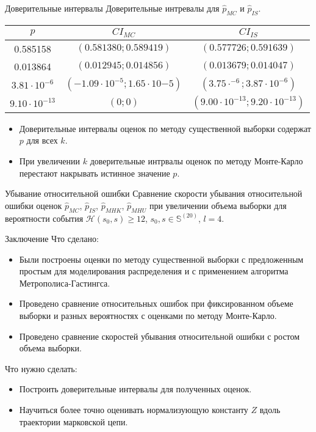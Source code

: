 \documentclass[pdf, 10pt, unicode]{beamer}
\begin{document}
\begin{frame}{Доверительные интервалы}
Доверительные интревалы для $\hat{p}_{MC}$ и $\hat{p}_{IS}$.
\begin{table}[]
\begin{tabular}{@{}ccc@{}}
\toprule
$p$      & $CI_{MC}$               & $CI_{IS}$               \\ \midrule
0.585158 & $(0.581380 ; 0.589419)$ & $(0.577726 ; 0.591639)$ \\
0.013864 & $(0.012945 ; 0.014856)$ & $(0.013679 ; 0.014047)$ \\
$3.81\cdot 10^{-6}$  & $(-1.09\cdot 10^{-5} ; 1.65\cdot 10{-5})$ & $(3.75\cdot^{-6} ; 3.87\cdot 10^{-6})$      \\
$9.10\cdot 10^{-13}$ & $(0 ; 0)$                                 & $(9.00\cdot 10^{-13} ; 9.20\cdot 10^{-13})$ \\ \bottomrule
\end{tabular}
\end{table}
    \begin{itemize}
        \item Доверительные интервалы оценок по методу существенной выборки содержат $p$ для всех $k$.
        \item При увеличении $k$ доверительные интрвалы оценок по методу Монте-Карло перестают накрывать истинное значение $p$.
    \end{itemize}

\end{frame}

\begin{frame}{Убывание относительной ошибки}
    Сравнение скорости убывания относительной ошибки оценок $\hat{p}_{MC}$, $\hat{p}_{IS}$, $\hat{p}_{MHK}$, $\hat{p}_{MHU}$ при увеличении объема выборки для вероятности события $\mathcal{H}(s_0,s)\geq 12$, $s_0, s \in \mathbb{S}^{(20)}$, $l = 4$.

\end{frame}

\begin{frame}{Заключение}
Что сделано:
\begin{itemize}
    \item Были построены оценки по методу существенной выборки с предложенным простым для моделирования распределения и с применением алгоритма Метрополиса-Гастингса.
    \item Проведено сравнение относительных ошибок при фиксированном объеме выборки и разных вероятностях с оценками по методу Монте-Карло.
    \item Проведено сравнение скоростей убывания относительной ошибки с ростом объема выборки. 
\end{itemize}

Что нужно сделать:
\begin{itemize}
    \item Построить доверительные интервалы для полученных оценок.
    \item Научиться более точно оценивать нормализующую константу $Z$ вдоль траектории марковской цепи.
\end{itemize}
    
\end{frame}
\end{document}
